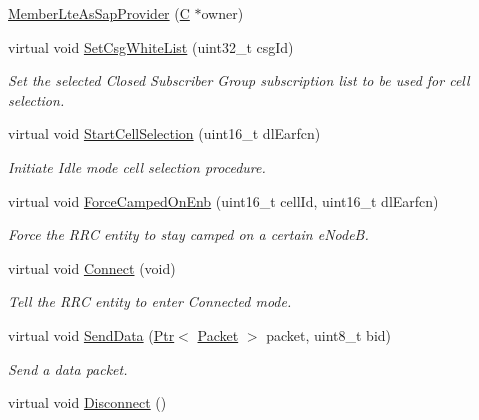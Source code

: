 \begin{DoxyCompactItemize}
\item 
\hyperlink{classns3_1_1MemberLteAsSapProvider_af1e1550e06854aa50aac324ab85957eb}{Member\+Lte\+As\+Sap\+Provider} (\hyperlink{loss__COST231__small__cities__urban_8m_aaa53ca0b650dfd85c4f59fa156f7a2cc}{C} $\ast$owner)
\item 
virtual void \hyperlink{classns3_1_1MemberLteAsSapProvider_af5390603f8c74e3f42c58991b9a7bb78}{Set\+Csg\+White\+List} (uint32\+\_\+t csg\+Id)
\begin{DoxyCompactList}\small\item\em Set the selected Closed Subscriber Group subscription list to be used for cell selection. \end{DoxyCompactList}\item 
virtual void \hyperlink{classns3_1_1MemberLteAsSapProvider_a80b3ef90b9ebbe48800db92327d79caa}{Start\+Cell\+Selection} (uint16\+\_\+t dl\+Earfcn)
\begin{DoxyCompactList}\small\item\em Initiate Idle mode cell selection procedure. \end{DoxyCompactList}\item 
virtual void \hyperlink{classns3_1_1MemberLteAsSapProvider_a114cb1650ba79f7cafce23a8ecdea7de}{Force\+Camped\+On\+Enb} (uint16\+\_\+t cell\+Id, uint16\+\_\+t dl\+Earfcn)
\begin{DoxyCompactList}\small\item\em Force the R\+RC entity to stay camped on a certain e\+NodeB. \end{DoxyCompactList}\item 
virtual void \hyperlink{classns3_1_1MemberLteAsSapProvider_a05776065f438529e634b94b3a26308e5}{Connect} (void)
\begin{DoxyCompactList}\small\item\em Tell the R\+RC entity to enter Connected mode. \end{DoxyCompactList}\item 
virtual void \hyperlink{classns3_1_1MemberLteAsSapProvider_a98d0852caebd5d05ba5aa3a89ba7384c}{Send\+Data} (\hyperlink{classns3_1_1Ptr}{Ptr}$<$ \hyperlink{classns3_1_1Packet}{Packet} $>$ packet, uint8\+\_\+t bid)
\begin{DoxyCompactList}\small\item\em Send a data packet. \end{DoxyCompactList}\item 
virtual void \hyperlink{classns3_1_1MemberLteAsSapProvider_a16bfa40d06513a45b8da081d6ae60498}{Disconnect} ()

\end{DoxyCompactItemize}
